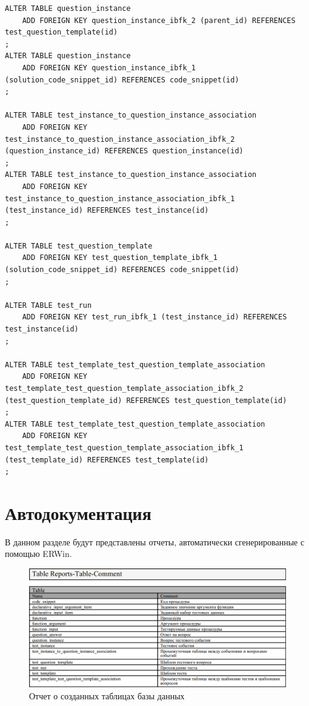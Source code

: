 \documentclass{article}
\begin{document}
\begin{lstlisting}
ALTER TABLE question_instance
	ADD FOREIGN KEY question_instance_ibfk_2 (parent_id) REFERENCES test_question_template(id)
;
ALTER TABLE question_instance
	ADD FOREIGN KEY question_instance_ibfk_1 (solution_code_snippet_id) REFERENCES code_snippet(id)
;

ALTER TABLE test_instance_to_question_instance_association
	ADD FOREIGN KEY test_instance_to_question_instance_association_ibfk_2 (question_instance_id) REFERENCES question_instance(id)
;
ALTER TABLE test_instance_to_question_instance_association
	ADD FOREIGN KEY test_instance_to_question_instance_association_ibfk_1 (test_instance_id) REFERENCES test_instance(id)
;

ALTER TABLE test_question_template
	ADD FOREIGN KEY test_question_template_ibfk_1 (solution_code_snippet_id) REFERENCES code_snippet(id)
;

ALTER TABLE test_run
	ADD FOREIGN KEY test_run_ibfk_1 (test_instance_id) REFERENCES test_instance(id)
;

ALTER TABLE test_template_test_question_template_association
	ADD FOREIGN KEY test_template_test_question_template_association_ibfk_2 (test_question_template_id) REFERENCES test_question_template(id)
;
ALTER TABLE test_template_test_question_template_association
	ADD FOREIGN KEY test_template_test_question_template_association_ibfk_1 (test_template_id) REFERENCES test_template(id)
;
\end{lstlisting}


\section{Автодокументация}
В данном разделе будут представлены отчеты, автоматически сгенерированные
с помощью ERWin.

\begin{figure}[H]
	\includegraphics[width=\textwidth, center]{TableDefinitions.png}
	\caption{Отчет о созданных таблицах базы данных}
\end{figure}
\end{document}
